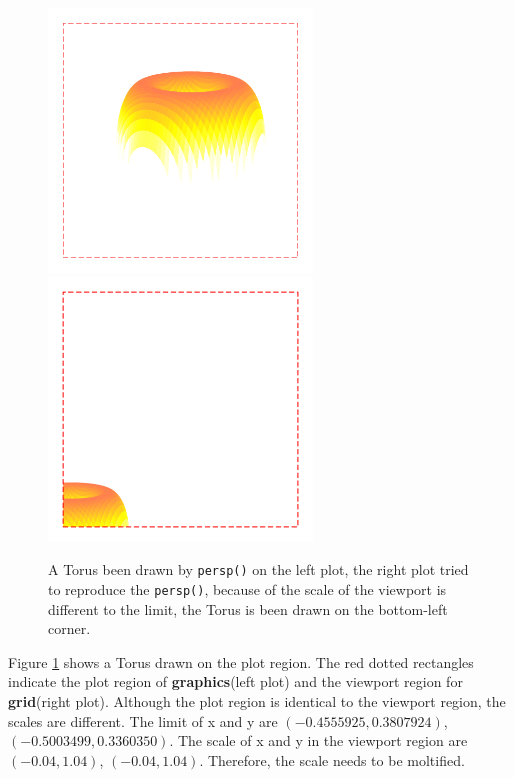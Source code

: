 \documentclass[paper=a4, fontsize=11pt]{report}
\begin{document}
\begin{figure}[h]
	\begin{center}
		\includegraphics[height = 7cm, width = 7cm]{figure/gridGraphics_persp_demo_viewport_1.pdf}
		\includegraphics[height = 7cm, width = 7cm]{figure/gridGraphics_persp_demo_viewport_2.pdf}
		\caption{A Torus been drawn by \texttt{persp()} on the left plot, the right plot tried to reproduce the \texttt{persp()}, because of the scale of the viewport is different to the limit, the Torus is been drawn on the bottom-left corner.}
		\label{figure_4.3}
	\end{center}
\end{figure}

Figure \ref{figure_4.3} shows a Torus drawn on the plot region. The red dotted rectangles indicate the plot region of \textbf{graphics}(left plot) and the viewport region for \textbf{grid}(right plot). Although the plot region is identical to the viewport region, the scales are different. The limit of x and y are $(-0.4555925,  0.3807924)$, $(-0.5003499,  0.3360350)$. The scale of x and y in the viewport region are $(-0.04,  1.04)$, $(-0.04,  1.04)$. Therefore, the scale needs to be moltified. \\
\end{document}

